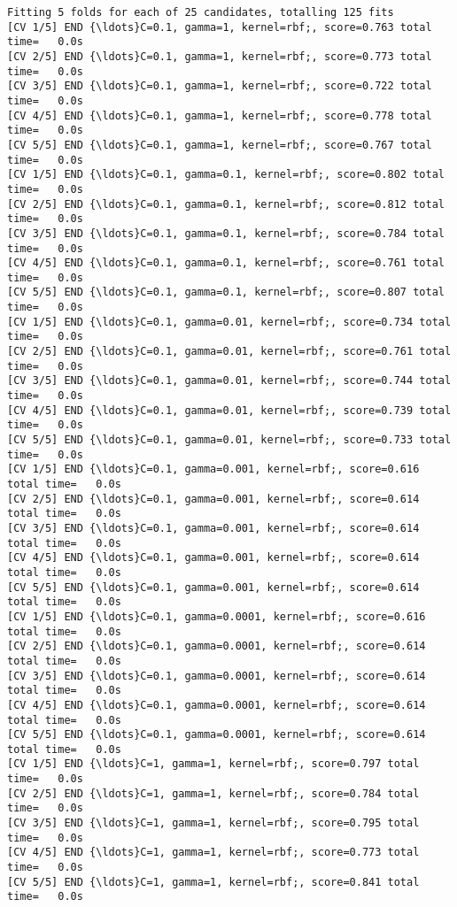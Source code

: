 \documentclass[11pt]{article}
\begin{document}
    \begin{Verbatim}[commandchars=\\\{\}]
Fitting 5 folds for each of 25 candidates, totalling 125 fits
[CV 1/5] END {\ldots}C=0.1, gamma=1, kernel=rbf;, score=0.763 total time=   0.0s
[CV 2/5] END {\ldots}C=0.1, gamma=1, kernel=rbf;, score=0.773 total time=   0.0s
[CV 3/5] END {\ldots}C=0.1, gamma=1, kernel=rbf;, score=0.722 total time=   0.0s
[CV 4/5] END {\ldots}C=0.1, gamma=1, kernel=rbf;, score=0.778 total time=   0.0s
[CV 5/5] END {\ldots}C=0.1, gamma=1, kernel=rbf;, score=0.767 total time=   0.0s
[CV 1/5] END {\ldots}C=0.1, gamma=0.1, kernel=rbf;, score=0.802 total time=   0.0s
[CV 2/5] END {\ldots}C=0.1, gamma=0.1, kernel=rbf;, score=0.812 total time=   0.0s
[CV 3/5] END {\ldots}C=0.1, gamma=0.1, kernel=rbf;, score=0.784 total time=   0.0s
[CV 4/5] END {\ldots}C=0.1, gamma=0.1, kernel=rbf;, score=0.761 total time=   0.0s
[CV 5/5] END {\ldots}C=0.1, gamma=0.1, kernel=rbf;, score=0.807 total time=   0.0s
[CV 1/5] END {\ldots}C=0.1, gamma=0.01, kernel=rbf;, score=0.734 total time=   0.0s
[CV 2/5] END {\ldots}C=0.1, gamma=0.01, kernel=rbf;, score=0.761 total time=   0.0s
[CV 3/5] END {\ldots}C=0.1, gamma=0.01, kernel=rbf;, score=0.744 total time=   0.0s
[CV 4/5] END {\ldots}C=0.1, gamma=0.01, kernel=rbf;, score=0.739 total time=   0.0s
[CV 5/5] END {\ldots}C=0.1, gamma=0.01, kernel=rbf;, score=0.733 total time=   0.0s
[CV 1/5] END {\ldots}C=0.1, gamma=0.001, kernel=rbf;, score=0.616 total time=   0.0s
[CV 2/5] END {\ldots}C=0.1, gamma=0.001, kernel=rbf;, score=0.614 total time=   0.0s
[CV 3/5] END {\ldots}C=0.1, gamma=0.001, kernel=rbf;, score=0.614 total time=   0.0s
[CV 4/5] END {\ldots}C=0.1, gamma=0.001, kernel=rbf;, score=0.614 total time=   0.0s
[CV 5/5] END {\ldots}C=0.1, gamma=0.001, kernel=rbf;, score=0.614 total time=   0.0s
[CV 1/5] END {\ldots}C=0.1, gamma=0.0001, kernel=rbf;, score=0.616 total time=   0.0s
[CV 2/5] END {\ldots}C=0.1, gamma=0.0001, kernel=rbf;, score=0.614 total time=   0.0s
[CV 3/5] END {\ldots}C=0.1, gamma=0.0001, kernel=rbf;, score=0.614 total time=   0.0s
[CV 4/5] END {\ldots}C=0.1, gamma=0.0001, kernel=rbf;, score=0.614 total time=   0.0s
[CV 5/5] END {\ldots}C=0.1, gamma=0.0001, kernel=rbf;, score=0.614 total time=   0.0s
[CV 1/5] END {\ldots}C=1, gamma=1, kernel=rbf;, score=0.797 total time=   0.0s
[CV 2/5] END {\ldots}C=1, gamma=1, kernel=rbf;, score=0.784 total time=   0.0s
[CV 3/5] END {\ldots}C=1, gamma=1, kernel=rbf;, score=0.795 total time=   0.0s
[CV 4/5] END {\ldots}C=1, gamma=1, kernel=rbf;, score=0.773 total time=   0.0s
[CV 5/5] END {\ldots}C=1, gamma=1, kernel=rbf;, score=0.841 total time=   0.0s

\end{Verbatim}
\end{document}
